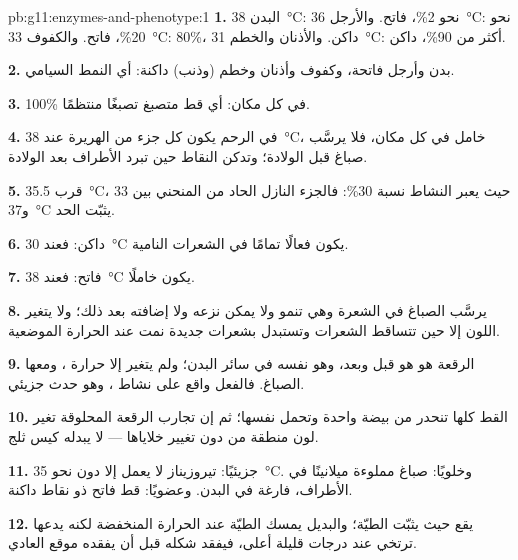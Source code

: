 \begin{solution}{pb:g11:enzymes-and-phenotype:1}
\textbf{1.} البدن \qty{38}{\celsius}: نحو 2\%، فاتح. والأرجل
\qty{36}{\celsius}: نحو 20\%، فاتح. والكفوف \qty{33}{\celsius}: 80\%،
داكن. والأذنان والخطم \qty{31}{\celsius}: أكثر من 90\%، داكن.

\textbf{2.} بدن وأرجل فاتحة، وكفوف وأذنان وخطم (وذنب) داكنة: أي النمط
السيامي.

\textbf{3.} 100\% في كل مكان: أي قط متصبغ تصبغًا منتظمًا.

\textbf{4.} في الرحم يكون كل جزء من الهريرة عند \qty{38}{\celsius}،
 خامل في كل مكان، فلا يرسَّب صباغ قبل الولادة؛ وتدكن النقاط
حين تبرد الأطراف بعد الولادة.

\textbf{5.} قرب \qty{35.5}{\celsius}، حيث يعبر النشاط نسبة 30\%:
فالجزء النازل الحاد من المنحني بين 33 و\qty{37}{\celsius} يثبّت الحد.

\textbf{6.} داكن: فعند \qty{30}{\celsius} يكون  فعالًا تمامًا
في الشعرات النامية.

\textbf{7.} فاتح: فعند \qty{38}{\celsius} يكون  خاملًا.

\textbf{8.} يرسَّب الصباغ في الشعرة وهي تنمو ولا يمكن نزعه ولا إضافته
بعد ذلك؛ ولا يتغير اللون إلا حين تتساقط الشعرات وتستبدل بشعرات جديدة
نمت عند الحرارة الموضعية.

\textbf{9.}   الرقعة هو هو قبل وبعد، وهو نفسه في
سائر البدن؛ ولم يتغير إلا حرارة ، ومعها الصباغ. فالفعل واقع على
نشاط ، وهو حدث جزيئي.

\textbf{10.}  القط كلها تنحدر من بيضة واحدة وتحمل  نفسها؛
ثم إن تجارب الرقعة المحلوقة تغير لون منطقة من دون تغيير خلاياها ---
 لا يبدله كيس ثلج.

\textbf{11.} جزيئيًا: تيروزيناز لا يعمل إلا دون نحو \qty{35}{\celsius}.
وخلويًا:  صباغ مملوءة ميلانينًا في الأطراف، فارغة في البدن.
وعضويًا: قط فاتح ذو نقاط داكنة.

\textbf{12.}  يقع حيث يثبّت الطيّة؛ والبديل يمسك الطيّة
عند الحرارة المنخفضة لكنه يدعها ترتخي عند درجات قليلة أعلى، فيفقد
 شكله قبل أن يفقده موقع  العادي.


\end{solution}

